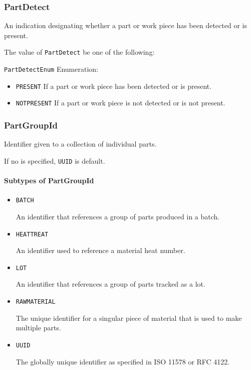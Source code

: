 \subsubsection{PartDetect}
\label{sec:PartDetect}



An indication designating whether a part or work piece has been detected or is present.



The value of \texttt{PartDetect} \MUST be one of the following: 


\texttt{PartDetectEnum} Enumeration:

\begin{itemize}
\item \texttt{PRESENT} \newline If a part or work piece has been detected or is present. 
\item \texttt{NOT\textunderscore PRESENT} \newline If a part or work piece is not detected or is not present. 
\end{itemize}

\FloatBarrier

\subsubsection{PartGroupId}
\label{sec:PartGroupId}



Identifier given to a collection of individual parts. 

If no  is specified, \texttt{UUID} is default.


\paragraph{Subtypes of PartGroupId}\mbox{}
\label{sec:Subtypes of PartGroupId}

\begin{itemize}

\item \texttt{BATCH}


An identifier that references a group of parts produced in a batch.

\item \texttt{HEAT\textunderscore TREAT}


An identifier used to reference a material heat number.

\item \texttt{LOT}


An identifier that references a group of parts tracked as a lot.


\item \texttt{RAW\textunderscore MATERIAL}


The unique identifier for a singular piece of material that is used to make multiple parts.


\item \texttt{UUID}


The globally unique identifier as specified in ISO 11578 or RFC 4122.


\end{itemize}

